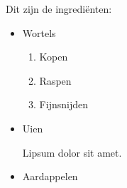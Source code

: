 \documentclass{article}
\begin{document}
Dit zijn de ingrediënten:
\begin{itemize}
    \item Wortels
    \begin{enumerate}
        \item Kopen
        \item Raspen
        \item Fijnsnijden
    \end{enumerate}
    \item Uien
    
    Lipsum dolor sit amet.
    \item Aardappelen
\end{itemize}
\end{document}
